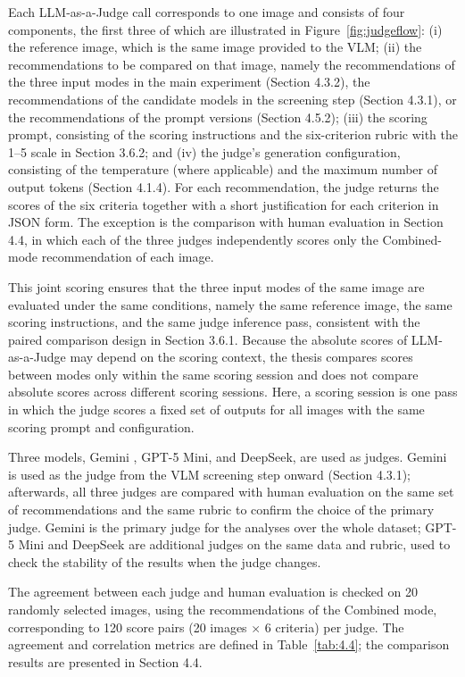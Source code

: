 \documentclass[12pt,a4paper]{report}
\begin{document}
Each LLM-as-a-Judge call corresponds to one image and consists of four components, the first three of which are illustrated in Figure~\ref{fig:judgeflow}: (i) the reference image, which is the same image provided to the VLM; (ii) the recommendations to be compared on that image, namely the recommendations of the three input modes in the main experiment (Section 4.3.2), the recommendations of the candidate models in the screening step (Section 4.3.1), or the recommendations of the prompt versions (Section 4.5.2); (iii) the scoring prompt, consisting of the scoring instructions and the six-criterion rubric with the 1--5 scale in Section 3.6.2; and (iv) the judge's generation configuration, consisting of the temperature (where applicable) and the maximum number of output tokens (Section 4.1.4). For each recommendation, the judge returns the scores of the six criteria together with a short justification for each criterion in JSON form. The exception is the comparison with human evaluation in Section 4.4, in which each of the three judges independently scores only the Combined-mode recommendation of each image.

This joint scoring ensures that the three input modes of the same image are evaluated under the same conditions, namely the same reference image, the same scoring instructions, and the same judge inference pass, consistent with the paired comparison design in Section 3.6.1. Because the absolute scores of LLM-as-a-Judge may depend on the scoring context, the thesis compares scores between modes only within the same scoring session and does not compare absolute scores across different scoring sessions. Here, a scoring session is one pass in which the judge scores a fixed set of outputs for all images with the same scoring prompt and configuration.

Three models, Gemini \cite{geminiteam2024}, GPT-5 Mini, and DeepSeek, are used as judges. Gemini is used as the judge from the VLM screening step onward (Section 4.3.1); afterwards, all three judges are compared with human evaluation on the same set of recommendations and the same rubric to confirm the choice of the primary judge. Gemini is the primary judge for the analyses over the whole dataset; GPT-5 Mini and DeepSeek are additional judges on the same data and rubric, used to check the stability of the results when the judge changes.

The agreement between each judge and human evaluation is checked on 20 randomly selected images, using the recommendations of the Combined mode, corresponding to 120 score pairs (20 images $\times$ 6 criteria) per judge. The agreement and correlation metrics are defined in Table~\ref{tab:4.4}; the comparison results are presented in Section 4.4.
\end{document}

